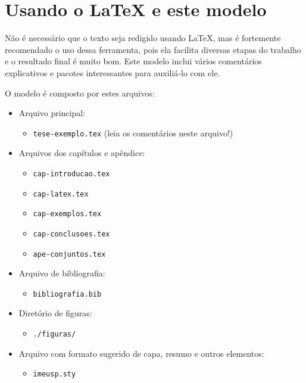 \chapter{Usando o \LaTeX{} e este modelo}

Não é necessário que o texto seja redigido usando \LaTeX{}, mas é fortemente
recomendado o uso dessa ferramenta, pois ela facilita diversas etapas do
trabalho e o resultado final é muito bom. Este modelo inclui vários
comentários explicativos e pacotes interessantes para auxiliá-lo com ele.

O modelo é composto por estes arquivos:

\begin{itemize}
  \item Arquivo principal:
  \begin{itemize}
	  \item \texttt{tese-exemplo.tex} (leia os comentários neste arquivo!)
  \end{itemize}

  \item Arquivos dos capítulos e apêndice:
  \begin{itemize}
    \item \texttt{cap-introducao.tex}
    \item \texttt{cap-latex.tex}
    \item \texttt{cap-exemplos.tex}
    \item \texttt{cap-conclusoes.tex}
    \item \texttt{ape-conjuntos.tex}
  \end{itemize}

  \item Arquivo de bibliografia:
  \begin{itemize}
    \item \texttt{bibliografia.bib}
  \end{itemize}

  \item Diretório de figuras:
  \begin{itemize}
    \item \texttt{./figuras/}
  \end{itemize}

  \item Arquivo com formato sugerido de capa, resumo e outros elementos:
  \begin{itemize}
    \item \texttt{imeusp.sty}
  \end{itemize}


\end{itemize}
